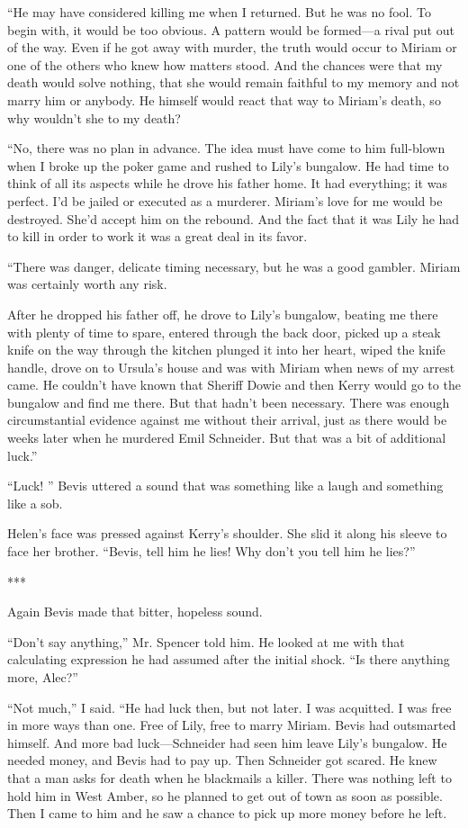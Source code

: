 \documentclass{novel}
\begin{document}
“He may have considered killing me when I returned. But he was no fool. To begin with, it would be too obvious. A pattern would be formed—a rival put out of the way. Even if he got away with murder, the truth would occur to Miriam or one of the others who knew how matters stood. And the chances were that my death would solve nothing, that she would remain faithful to my memory and not marry him or anybody. He himself would react that way to Miriam’s death, so why wouldn’t she to my death?

“No, there was no plan in advance. The idea must have come to him full-blown when I broke up the poker game and rushed to Lily’s bungalow. He had time to think of all its aspects while he drove his father home. It had everything; it was perfect. I’d be jailed or executed as a murderer. Miriam’s love for me would be destroyed. She’d accept him on the rebound. And the fact that it was Lily he had to kill in order to work it was a great deal in its favor.

“There was danger, delicate timing necessary, but he was a good gambler. Miriam was certainly worth any risk.

After he dropped his father off, he drove to Lily’s bungalow, beating me there with plenty of time to spare, entered through the back door, picked up a steak knife on the way through the kitchen plunged it into her heart, wiped the knife handle, drove on to Ursula’s house and was with Miriam when news of my arrest came. He couldn’t have known that Sheriff Dowie and then Kerry would go to the bungalow and find me there. But that hadn’t been necessary. There was enough circumstantial evidence against me without their arrival, just as there would be weeks later when he murdered Emil Schneider. But that was a bit of additional luck.”

“Luck! ” Bevis uttered a sound that was something like a laugh and something like a sob.

Helen’s face was pressed against Kerry’s shoulder. She slid it along his sleeve to face her brother. “Bevis, tell him he lies! Why don’t you tell him he lies?”

***

Again Bevis made that bitter, hopeless sound.

“Don’t say anything,” Mr. Spencer told him. He looked at me with that calculating expression he had assumed after the initial shock. “Is there anything more, Alec?”

“Not much,” I said. “He had luck then, but not later. I was acquitted. I was free in more ways than one. Free of Lily, free to marry Miriam. Bevis had outsmarted himself. And more bad luck—Schneider had seen him leave Lily’s bungalow. He needed money, and Bevis had to pay up. Then Schneider got scared. He knew that a man asks for death when he blackmails a killer. There was nothing left to hold him in West Amber, so he planned to get out of town as soon as possible. Then I came to him and he saw a chance to pick up more money before he left.
\end{document}

